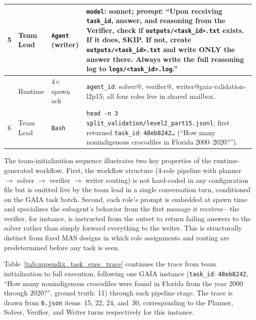 \begin{table}[t]
{\begin{tabular}{cp{}p{}p{}}
        \midrule
        5 & Team Lead & \texttt{Agent} (writer) & \texttt{model}: sonnet; \textit{prompt}: ``Upon receiving \texttt{task\_id}, answer, and reasoning from the Verifier, check if \texttt{outputs/<task\_id>.txt} exists. If it does, SKIP. If not, create \texttt{outputs/<task\_id>.txt} and write ONLY the answer there. Always write the full reasoning log to \texttt{logs/<task\_id>.log}.'' \\
        \midrule
        & Runtime & 4$\times$ spawn ack & \texttt{agent\_id}: solver@, verifier@, writer@gaia-validation-l2p15; all four roles live in shared mailbox. \\
        \midrule
        6 & Team Lead & \texttt{Bash} & \texttt{head -n 3 split\_validation/level2\_part15.jsonl}; first returned \texttt{task\_id}: \texttt{48eb8242{\ldots}} (``How many nonindigenous crocodiles in Florida 2000--2020?''). \\
        \bottomrule
    \end{tabular}
    }
\end{table}

The team-initialization sequence illustrates two key properties of the runtime-generated workflow. First, the workflow structure (4-role pipeline with planner $\to$ solver $\to$ verifier $\to$ writer routing) is not hard-coded in any configuration file but is emitted live by the team lead in a single conversation turn, conditioned on the GAIA task batch. Second, each role's prompt is embedded at spawn time and specializes the subagent's behavior from the first message it receives---the verifier, for instance, is instructed from the outset to return failing answers to the solver rather than simply forward everything to the writer. This is structurally distinct from fixed MAS designs in which role assignments and routing are predetermined before any task is seen.

Table~\ref{tab:appendix_task_exec_trace} continues the trace from team initialization to full execution, following one GAIA instance (\texttt{task\_id}: \texttt{48eb8242}, ``How many nonindigenous crocodiles were found in Florida from the year 2000 through 2020?'', ground truth: 11) through each pipeline stage. The trace is drawn from \texttt{6.json} items~15, 22, 24, and~30, corresponding to the Planner, Solver, Verifier, and Writer turns respectively for this instance.

